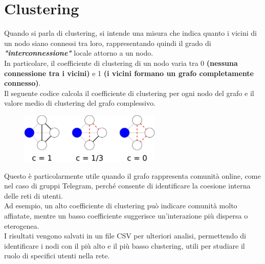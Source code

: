 \documentclass[12pt]{article}
\begin{document}
	\section{Clustering}
	Quando si parla di clustering, si intende una misura che indica quanto i vicini di un nodo siano connessi tra loro, rappresentando quindi il grado di \textbf{\textit{"interconnessione"}} locale attorno a un nodo.\\
	In particolare, il coefficiente di clustering di un nodo varia tra 0 \textbf{(nessuna connessione tra i vicini)} e 1 \textbf{(i vicini formano un grafo completamente connesso)}.\\
	Il seguente codice calcola il coefficiente di clustering per ogni nodo del grafo e il valore medio di clustering del grafo complessivo.
	\begin{figure}[H]
		\centering
		\includegraphics[width=0.6\textwidth]{immagini/clustering}
	\end{figure}
	Questo è particolarmente utile quando il grafo rappresenta comunità online, come nel caso di gruppi Telegram, perché consente di identificare la coesione interna delle reti di utenti.\\
	Ad esempio, un alto coefficiente di clustering può indicare comunità molto affiatate, mentre un basso coefficiente suggerisce un'interazione più dispersa o eterogenea.\\
	I risultati vengono salvati in un file CSV per ulteriori analisi, permettendo di identificare i nodi con il più alto e il più basso clustering, utili per studiare il ruolo di specifici utenti nella rete.
\end{document}
